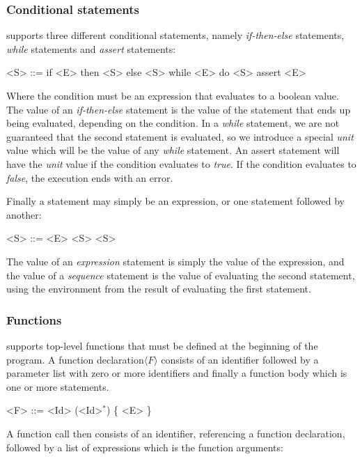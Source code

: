 \subsubsection{Conditional statements}
\explanguage supports three different conditional statements, namely \textsl{if-then-else} statements, \textsl{while} statements and \textsl{assert} statements:

\begin{grammar}
	<S> ::= if <E> then <S> else <S>
	\alt while <E> do <S>
	\alt assert <E>
\end{grammar}
Where the condition must be an expression that evaluates to a boolean value. 
The value of an \textsl{if-then-else} statement is the value of the statement that ends up being evaluated, depending on the condition. In a \textsl{while} statement, we are not guaranteed that the second statement is evaluated, so we introduce a special \textsl{unit} value which will be the value of any \textsl{while} statement. An assert statement will have the \textsl{unit} value if the condition evaluates to \textsl{true}. If the condition evaluates to \textsl{false}, the execution ends with an error.

\bigskip

Finally a statement may simply be an expression, or one statement followed by another:

\begin{grammar}
	<S> ::= <E>
	 <S>
\end{grammar}
 The value of an \textsl{expression} statement is simply the value of the expression, and the value of a \textsl{sequence} statement is the value of evaluating the second statement, using the environment from the result of evaluating the first statement. 
 

\subsubsection{Functions}
\explanguage supports top-level functions that must be defined at the beginning of the program. A function declaration$\langle F \rangle$ consists of an identifier followed by a parameter list with zero or more identifiers and finally a function body which is one or more statements.

\begin{grammar}
	<F> ::= <Id> (<Id>$^{*}$) \{ <E> \}
\end{grammar}

A function call then consists of an identifier, referencing a function declaration, followed by a list of expressions which is the function arguments:

